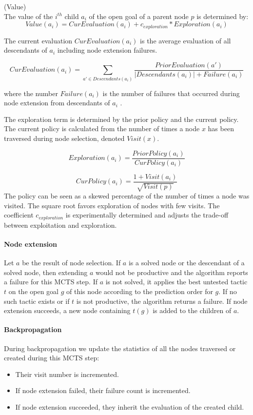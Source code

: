 \documentclass[runningheads,a4paper,draft]{svjour3}
\begin{document}
\begin{definition}\label{def:value}(Value)\\
The value of the $i^{th}$ child $a_i$ of the open goal of a parent node $p$
is determined by:
  \[\mathit{Value}(a_i) = \mathit{CurEvaluation}(a_i) + c_{\mathit{exploration}} *
\mathit{Exploration}(a_i)\]

The current evaluation $CurEvaluation(a_i)$ is the average evaluation of
all descendants of $a_i$ including node extension failures.

\[\mathit{CurEvaluation}(a_i) =
  \sum_{a' \in \mathit{Descendants}(a_i)} \frac{\mathit{PriorEvaluation}(a')}
  {|\mathit{Descendants}(a_i)| + \mathit{Failure}(a_i)}\]

where the number $\mathit{Failure}(a_i)$ is the number of failures that occurred
during node extension from descendants of $a_i$ .

The exploration term is determined by the prior policy and the current policy.
The current policy is calculated from the number of times a node $x$ has been
traversed during node selection, denoted $\mathit{Visit}(x)$.

\[\mathit{Exploration}(a_i) =
\frac{\mathit{PriorPolicy}(a_i)}{\mathit{CurPolicy}(a_i)}\]

\[\mathit{CurPolicy}(a_i) = \frac{1 +
\mathit{Visit}(a_i)}{\sqrt{\mathit{Visit}(p)}}\]
The policy can be seen as a skewed percentage of the number of times a node was
visited. The square root favors exploration of nodes with
  few visits. The coefficient $c_{\mathit{exploration}}$ is experimentally determined and
adjusts the trade-off between exploitation and exploration.
\end{definition}

\paragraph{Node extension}
Let $a$ be the result of node selection.
If $a$ is a solved node or the descendant of a solved node, then extending $a$
would not be productive and the algorithm reports a failure for this MCTS step.
If $a$ is not solved, it applies the best untested tactic $t$ on the open
goal $g$ of this
node according to the prediction order for $g$.
If no such tactic exists or if $t$ is not productive, the algorithm returns a
failure.
If node extension succeeds, a new node containing $t(g)$ is added to the
children of $a$.


\paragraph{Backpropagation}
During backpropagation we update the statistics of all the nodes traversed or
created during this MCTS step:
\begin{itemize}
\item Their visit number is incremented.
\item If node extension failed, their failure count is incremented.
\item If node extension succeeded, they inherit the evaluation of the created
child.
\end{itemize}
\end{document}
